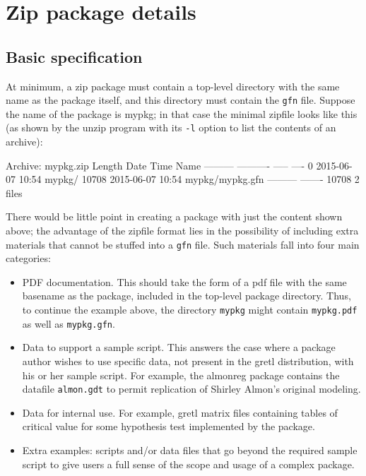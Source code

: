 \documentclass[oneside]{book}
\begin{document}
\chapter{Zip package details}
\label{chap:zipfile}

\section{Basic specification}

At minimum, a zip package must contain a top-level directory with the
same name as the package itself, and this directory must contain the
\texttt{gfn} file. Suppose the name of the package is \textsf{mypkg};
in that case the minimal zipfile looks like this (as shown by the
\textsf{unzip} program with its \texttt{-l} option to list the
contents of an archive):

\begin{code}
Archive:  mypkg.zip
  Length      Date    Time    Name
---------  ---------- -----   ----
        0  2015-06-07 10:54   mypkg/
    10708  2015-06-07 10:54   mypkg/mypkg.gfn
---------                     -------
    10708                     2 files
\end{code}

There would be little point in creating a package with just the
content shown above; the advantage of the zipfile format lies in the
possibility of including extra materials that cannot be stuffed into
a \texttt{gfn} file. Such materials fall into four main categories:

\begin{itemize}
\item PDF documentation. This should take the form of a pdf file with
  the same basename as the package, included in the top-level package
  directory. Thus, to continue the example above, the directory
  \texttt{mypkg} might contain \texttt{mypkg.pdf} as well as
  \texttt{mypkg.gfn}.
\item Data to support a sample script. This answers the case where a
  package author wishes to use specific data, not present in the gretl
  distribution, with his or her sample script. For example, the
  \textsf{almonreg} package contains the datafile \texttt{almon.gdt}
  to permit replication of Shirley Almon's original modeling.
\item Data for internal use. For example, gretl matrix files
  containing tables of critical value for some hypothesis test
  implemented by the package.
\item Extra examples: scripts and/or data files that go beyond the
  required sample script to give users a full sense of the scope and
  usage of a complex package.
\end{itemize}
\end{document}
